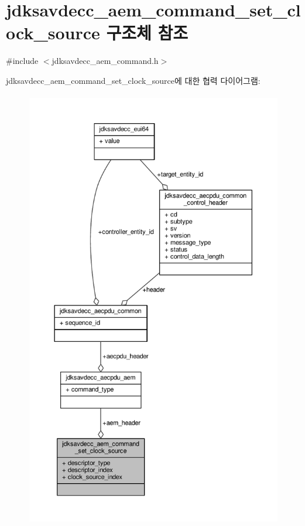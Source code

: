 \hypertarget{structjdksavdecc__aem__command__set__clock__source}{}\section{jdksavdecc\+\_\+aem\+\_\+command\+\_\+set\+\_\+clock\+\_\+source 구조체 참조}
\label{structjdksavdecc__aem__command__set__clock__source}


{\ttfamily \#include $<$jdksavdecc\+\_\+aem\+\_\+command.\+h$>$}



jdksavdecc\+\_\+aem\+\_\+command\+\_\+set\+\_\+clock\+\_\+source에 대한 협력 다이어그램\+:
\nopagebreak
\begin{figure}[H]
\begin{center}
\leavevmode
\includegraphics[height=550pt]{structjdksavdecc__aem__command__set__clock__source__coll__graph}
\end{center}
\end{figure}
